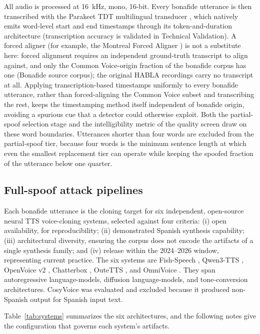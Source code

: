 \documentclass[11pt]{article}
\begin{document}
All audio is processed at \SI{16}{\kilo\hertz}, mono, 16-bit. Every bonafide utterance is then transcribed with the Parakeet TDT multilingual transducer \citep{tdt,parakeet}, which natively emits word-level start and end timestamps through its token-and-duration architecture (transcription accuracy is validated in Technical Validation). A forced aligner (for example, the Montreal Forced Aligner \citep{mfa}) is not a substitute here: forced alignment requires an independent ground-truth transcript to align against, and only the Common Voice-origin fraction of the bonafide corpus has one (Bonafide source corpus); the original HABLA recordings carry no transcript at all. Applying transcription-based timestamps uniformly to every bonafide utterance, rather than forced-aligning the Common Voice subset and transcribing the rest, keeps the timestamping method itself independent of bonafide origin, avoiding a spurious cue that a detector could otherwise exploit.
Both the partial-spoof selection stage and the intelligibility metric of the quality screen draw on these word boundaries.
Utterances shorter than four words are excluded from the partial-spoof tier, because four words is the minimum sentence length at which even the smallest replacement tier can operate while keeping the spoofed fraction of the utterance below one quarter.

\subsection*{Full-spoof attack pipelines}

Each bonafide utterance is the cloning target for six independent,
open-source neural TTS voice-cloning systems, selected against four
criteria: (i) open availability, for reproducibility; (ii) demonstrated
Spanish synthesis capability; (iii) architectural diversity, ensuring
the corpus does not encode the artifacts of a single synthesis family; and
(iv) release within the 2024--2026 window, representing current
practice. The six systems are Fish-Speech \citep{fishspeech}, Qwen3-TTS
\citep{qwen3tts}, OpenVoice v2 \citep{openvoice}, Chatterbox
\citep{chatterbox}, OuteTTS \citep{outetts}, and OmniVoice
\citep{omnivoice}. They span autoregressive language-models, diffusion
language-models, and tone-conversion architectures. CosyVoice
\citep{cosyvoice} was evaluated and excluded because it produced
non-Spanish output for Spanish input text.

Table~\ref{tab:systems} summarizes the six architectures, and the
following notes give the configuration that governs each system's
artifacts.
\end{document}

